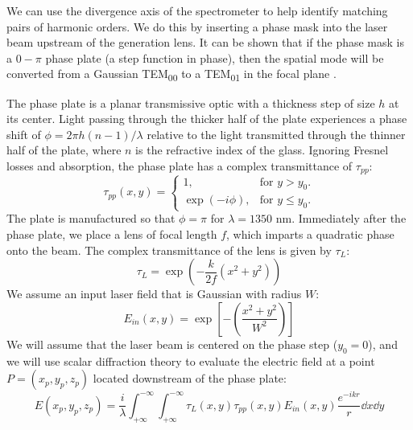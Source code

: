 We can use the divergence axis of the spectrometer to help identify matching pairs of harmonic orders. We do this by inserting a phase mask into the laser beam upstream of the generation lens. It can be shown that if the phase mask is a $0-\pi$ phase plate (a step function in phase), then the spatial mode will be converted from a Gaussian TEM\textsubscript{00} to a TEM\textsubscript{01} in the focal plane \cite{hagemanComplexAttosecondTransientAbsorption2020,camperHighRelativephasePrecision2019,camperTransverseElectromagneticMode2015,camperHighharmonicPhaseSpectroscopy2014,camperCombinedHighharmonicInterferometries2015}.

The phase plate is a planar transmissive optic with a thickness step of size $h$ at its center. Light passing through the thicker half of the plate experiences a phase shift of $\phi = 2 \pi h (n-1)/\lambda$ relative to the light transmitted through the thinner half of the plate, where $n$ is the refractive index of the glass. Ignoring Fresnel losses and absorption, the phase plate has a complex transmittance of $\tau_{pp}$:
\begin{equation}
\tau_{pp} (x, y) =  \begin{cases}
1, & \textrm{for $y > y_0$}.\\
\exp (-i \phi), & \textrm{for $y \le y_0$}.
\end{cases}
\end{equation}
The plate is manufactured so that $\phi=\pi$ for $\lambda = 1350 \textrm{ nm}$. Immediately after the phase plate, we place a lens of focal length $f$, which imparts a quadratic phase onto the beam. The complex transmittance of the lens is given by $\tau_L$:
\begin{equation}
\tau_L = \exp \left( - \frac{k}{2 f} (x^2 + y^2) \right)
\end{equation}
We assume an input laser field that is Gaussian with radius $W$:
\begin{equation}
E_{in}(x,y) = \exp \left[ - \left( \frac{x^2+y^2}{W^2} \right) \right]
\label{eqn:gaussian_profile}
\end{equation}
We will assume that the laser beam is centered on the phase step ($y_0 = 0$), and we will use scalar diffraction theory to evaluate the electric field at a point $P=(x_p, y_p, z_p)$ located downstream of the phase plate:
\begin{equation}
E(x_p, y_p, z_p) = \frac{i}{\lambda} \int_{+ \infty}^{- \infty} \int_{+ \infty}^{- \infty} \tau_{L} (x,y) \tau_{pp} (x,y) E_{in} (x,y) \frac{e^{-i k r}}{r} \dd{x} \dd{y}
\label{eqn:diffraction_integral}
\end{equation}

